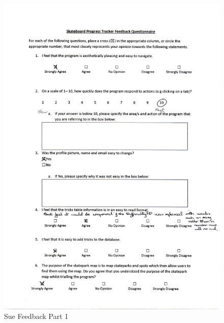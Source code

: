 \begin{itemize}
\begin{figure}[H]
    \includegraphics[width=\textwidth]{./Evaluation/images/SueFeedback1.pdf}
    \caption{Sue Feedback Part 1} \label{fig:SueFeedback1}
\end{figure}


\end{itemize}
